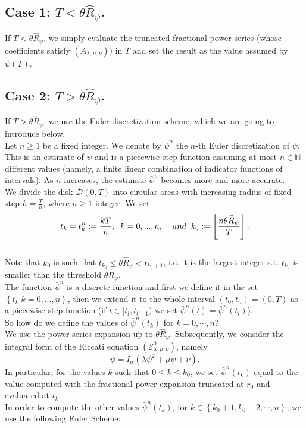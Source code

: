 \documentclass[a4paper,italian,11pt]{book}
\theoremstyle{plain}
\theoremstyle{remark}
\theoremstyle{plain}
\begin{document}
\subsection{Case 1: $T< \theta \widehat{R}_\psi$.}
If $T< \theta \widehat{R}_\psi$,
we simply evaluate the truncated fractional power series (whose coefficients satisfy $(A_{\lambda, \mu, \nu} )$) in $T$ and set the result as the value assumed by $\psi(T)$.

\subsection{Case 2: $T >  \theta \widehat{R}_\psi$.}
\label{subsection: firstpsin}
If $T >  \theta \widehat{R}_\psi$,
we use the Euler discretization scheme, which we are going to introduce below.
\\ 
Let $n\ge1 $ be a fixed integer. We denote by $\bar{\psi}^n$ the $n$-th Euler discretization of $\psi$. This is an estimate of $\psi$ and is a piecewise step function assuming at most $n\in \mathbb{N}$ different values (namely, a finite linear combination of indicator functions of intervals). As $n$ increases, the estimate $\bar{\psi}^n$ becomes more and more accurate.\\

We divide the disk $\mathcal{D}(0,T)$ into circular areas with increasing radius of fixed step $h=\frac{T}{n}$, where $n\ge 1$ integer. 
We set  
\begin{equation}\label{eq: tk and k0}
     t_k = t_k^n := \frac{kT}{n}, \hspace{0.2cm} k=0,...,n, \hspace{0.4cm} and \hspace{0.2cm} k_0 := \left\lfloor \frac{n \theta \widehat{R}_\psi }{T}\right\rfloor.
\end{equation}
\\
Note that $k_0$ is such that $t_{k_0} \le \theta \widehat{R}_\psi <t_{k_0 +1}$, i.e. it is the largest integer s.t. $t_{k_0}$ is smaller than the threshold $\theta \widehat{R}_\psi$.  \\
The function $\bar{\psi}^n$ is a discrete function and first we define it in the set $\left\{t_k| k=0,...,n \right\}$, then we extend it to the whole interval $(t_0,t_n) = (0,T)$ as a piecewise step function (if $t\in [t_l,t_{l+1})$ we set $\bar{\psi}^n(t) = \bar{\psi}^n(t_l)$). \\

So how do we define the values of $\bar{\psi}^n(t_k)$ for $k=0,\cdots,n$?
\\
We use the power series expansion up to $  \theta \widehat{R}_\psi$. Subsequently, we consider the integral form of the Riccati  equation $(\mathcal{E} ^0_{\lambda, \mu, \nu})$, namely
$$ \psi = I_\alpha \left( \lambda \psi^2 + \mu \psi + \nu \right).$$
In particular, for the values $k$ such that $0 \le k\le k_0$, we set $\bar{\psi}^n(t_k)$ equal to the value computed with the fractional power expansion truncated at $r_0$ and evaluated at $t_k$.
\\
In order to compute the other values $\bar{\psi}^n (t_k)$, for $k \in \left\{ k_0+1, k_0+2, \cdots, n \right\}$, we use the following Euler Scheme:
\end{document}
